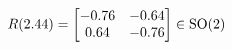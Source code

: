 \documentclass[preview]{standalone}
\begin{document}
\begin{align*}
\special{dvisvgm:raw <g id='unique000'>}R(2.44) = \begin{bmatrix} -0.76 & -0.64 \\ 0.64 & -0.76 \end{bmatrix} \in \text{SO}(2)\special{dvisvgm:raw </g>}
\end{align*}
\end{document}
